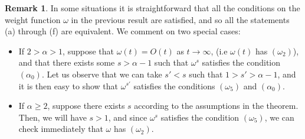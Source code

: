 \documentclass[11pt,a4paper]{article}
\theoremstyle{plain}
\theoremstyle{definition}
\newtheorem{remark}[proposition]{Remark}
\newcommand{\red}[1]{{\color{red}#1}}
\begin{document}
\begin{remark}
{In some situations it is straightforward that all the conditions on the weight function $\omega$ in the previous result are satisfied, and so all the statements (a) through (f) are equivalent. We comment on two special cases:}
\begin{itemize}
    \item[(i)] If $2>\alpha> 1$, suppose that $\omega(t) = O(t)$ as $t\to\infty$, (i.e $\omega(t)$ has $(\omega_2)$), and that there exists some $s > \alpha -1$ such that $\omega^s$ satisfies the condition $(\alpha_0)$. Let us observe that we can take $s'<s$ such that $1>s'> \alpha -1$, and it is then easy to show that $\omega^{s'}$ satisfies the conditions $(\omega_5)$ and $(\alpha_0)$.

     \item[(ii)] If $\alpha\geq 2$, suppose there exists $s$ according to the assumptions in the theorem. Then, we will have $s>1$, and since $\omega^s$ satisfies the condition $(\omega_5)$, we can check immediately that $\omega$ has $(\omega_2)$.
\end{itemize}

\end{remark}
\end{document}
